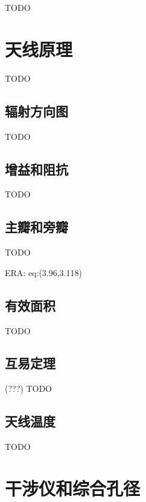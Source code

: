 TODO


\section{天线原理}
\label{sec:antenna}

TODO

\subsection{辐射方向图}

TODO

\subsection{增益和阻抗}

TODO

\subsection{主瓣和旁瓣}

TODO

ERA: eq:(3.96,3.118)

\subsection{有效面积}

TODO

\subsection{互易定理}

(???) TODO

\subsection{天线温度}

TODO


\section{干涉仪和综合孔径}
\label{sec:interferometer}

